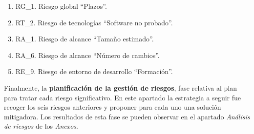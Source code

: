 \begin{enumerate}
\item RG\_1. Riesgo global “Plazos”. 
\item RT\_2. Riesgo de tecnologías “Software no probado”. 
\item RA\_1. Riesgo de alcance “Tamaño estimado”. 
\item RA\_6. Riesgo de alcance “Número de cambios”.  
\item RE\_9. Riesgo de entorno de desarrollo “Formación”. 
\end{enumerate}
\par Finalmente, la \textbf{planificación de la gestión de riesgos}, fase relativa al plan para tratar cada riesgo significativo. En este apartado la estrategia a seguir fue recoger los seis riesgos anteriores y proponer para cada uno una solución mitigadora. Los resultados de esta fase se pueden observar en el apartado \textit{Análisis de riesgos} de los \textit{Anexos}.

